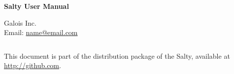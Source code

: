 \begin{titlepage}
\begin{center}
  \begin{Huge}
  \textbf{Salty User Manual}\\
  \end{Huge}
  \vspace{0.5cm}
  \vspace{4.0cm}

  \begin{Large}
    \begin{bf}
       
    \end{bf}
  \end{Large}

  \vspace{1cm}
  {Galois Inc.}\\

  \vspace{1cm}
  Email: \url{name@email.com}\\
  \vspace{4.0cm}
\end{center}
\vspace{1in}
\end{titlepage}



\newpage
\thispagestyle{empty}
$~~~~~~~~~~~~~~~~~~~~~~~~~~~~~~~~~~$\\
\vspace{15cm}

\noindent This document is part of the distribution package of the
Salty, available at \url{http://github.com}. \\


\noindent

